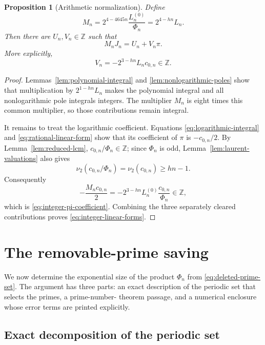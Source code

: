 \documentclass[11pt,reqno,letterpaper]{amsart}
\numberwithin{equation}{section}
\newtheorem{proposition}[theorem]{Proposition}
\theoremstyle{definition}
\theoremstyle{remark}
\begin{document}
\begin{proposition}[Arithmetic normalization]\label{prop:arithmetic-normalization}
Define
\begin{equation}\label{eq:arithmetic-multiplier}
 M_n=2^{4-4645n}\frac{L_n^{(0)}}{\Phi_n}
 =2^{4-hn}L_n.
\end{equation}
Then there are $U_n,V_n\in\mathbb Z$ such that
\begin{equation}\label{eq:integer-linear-forms}
 \boxed{M_nJ_n=U_n+V_n\pi.}
\end{equation}
More explicitly,
\begin{equation}\label{eq:integer-pi-coefficient}
 V_n=-2^{3-hn}L_n c_{0,n}\in\mathbb Z.
\end{equation}
\end{proposition}

\begin{proof}
Lemmas~\ref{lem:polynomial-integral} and
\ref{lem:nonlogarithmic-poles} show that multiplication by
$2^{1-hn}L_n$ makes the polynomial integral and all nonlogarithmic pole
integrals integers.  The multiplier $M_n$ is eight times this common
multiplier, so those contributions remain integral.

It remains to treat the logarithmic coefficient.  Equations
\eqref{eq:logarithmic-integral} and \eqref{eq:rational-linear-form} show
that its coefficient of $\pi$ is $-c_{0,n}/2$.  By
Lemma~\ref{lem:reduced-lcm}, $c_{0,n}/\Phi_n\in\mathbb Z$; since
$\Phi_n$ is odd, Lemma~\ref{lem:laurent-valuations} also gives
\[
 \nu_2(c_{0,n}/\Phi_n)=\nu_2(c_{0,n})\geq hn-1.
\]
Consequently
\[
 -\frac{M_nc_{0,n}}2
 =-2^{3-hn}L_n^{(0)}\frac{c_{0,n}}{\Phi_n}
 \in\mathbb Z,
\]
which is \eqref{eq:integer-pi-coefficient}.  Combining the three
separately cleared contributions proves \eqref{eq:integer-linear-forms}.
\end{proof}

\section{The removable-prime saving}\label{sec:prime-saving}

We now determine the exponential size of the product \(\Phi_n\) from
\eqref{eq:deleted-prime-set}.  The argument has three parts: an exact
description of the periodic set that selects the primes, a prime-number-
theorem passage, and a numerical enclosure whose error terms are printed
explicitly.

\subsection{Exact decomposition of the periodic set}
\end{document}

